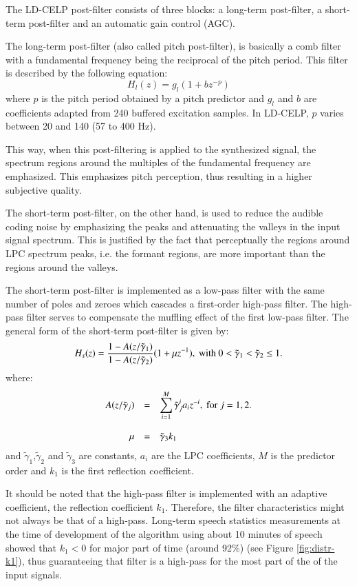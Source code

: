 The LD-CELP post-filter consists of three blocks: a long-term
post-filter, a short-term post-filter and an automatic gain control (AGC).

The long-term post-filter (also called pitch post-filter), is
basically a comb filter with a fundamental frequency being the
reciprocal of the pitch period. This filter is described by the
following equation:
\[
    H_l(z) = g_l (1 + b z^{-p})
\]
where $p$ is the pitch period obtained by a pitch predictor and $g_l$
and $b$ are coefficients adapted from 240 buffered excitation
samples. In LD-CELP, $p$ varies between 20 and 140 (57 to 400 Hz).

This way, when this post-filtering is applied to the synthesized
signal, the spectrum regions around the multiples of the fundamental
frequency are emphasized. This emphasizes pitch perception, thus
resulting in a higher subjective quality.

The short-term post-filter, on the other hand, is used to reduce the
audible coding noise by emphasizing the peaks and attenuating the
valleys in the input signal spectrum. This is justified by the fact
that perceptually the regions around LPC spectrum peaks, i.e. the
formant regions, are more important than the regions around the
valleys.

The short-term post-filter is implemented as a low-pass filter with
the same number of poles and zeroes which cascades a first-order
high-pass filter. The high-pass filter serves to compensate the
muffling effect of the first low-pass filter. The general form of the
short-term post-filter is given by:
\[
	H_s(z)= { 1 - A(z/\tilde{\gamma}_1) \over 1 - A(z/\tilde{\gamma}_2) } (1 + \mu z^{-1}), 
              \mbox{ with } 0 <\tilde{\gamma}_1 < \tilde{\gamma}_2 \le 1.
\]
where:
\[
\begin{array}{lll}
   A(z/\tilde{\gamma}_j) &= 
    &\displaystyle \sum_{i=1}^M \tilde{\gamma}_j^{i} a_i z^{-i}, \mbox{ for } j=1,2.\\
   \hfill \mu &= &\tilde{\gamma}_3 k_1 \mbox{\ruley{2em}}\\
\end{array}
\]
and $\tilde{\gamma}_1$,$\tilde{\gamma}_2$ and $\tilde{\gamma}_3$ are constants, $a_i$ are the
LPC coefficients, $M$ is the predictor order and $k_1$ is the first
reflection coefficient.

It should be noted that the high-pass filter is implemented with an
adaptive coefficient, the reflection coefficient $k_1$. Therefore, the
filter characteristics might not always be that of a
high-pass. Long-term speech statistics measurements at the time of
development of the algorithm using about 10 minutes of speech showed
that $k_1<0$ for major part of time (around 92\%) (see Figure
\ref{fig:distr-k1}), thus guaranteeing that filter is a high-pass for
the most part of the of the input signals.

